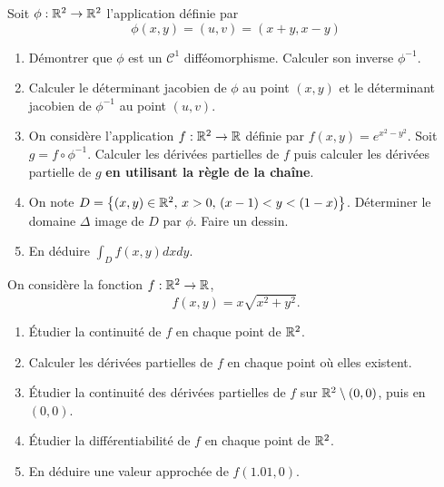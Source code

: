 \documentclass{tp_um}
\begin{document}
\exo{} Soit $\phi:\mathbb{R}^2\to\mathbb{R}^2$ l'application définie par 
\[
		\phi(x,y) = (u,v) = (x+y,x-y) 
\]
\begin{enumerate}
	\item Démontrer que $\phi$ est un $\mathcal C^1$ difféomorphisme. Calculer son inverse $\phi^{-1}$.
	\item Calculer le déterminant jacobien de $\phi$ au point $(x,y)$ et le déterminant jacobien de $\phi^{-1}$ au point $(u,v)$.
	\item On considère l'application $f: \mathbb{R}^2 \to \mathbb{R}$  définie par $f(x,y) = e^{x^2 -y^2}$. Soit
		$g = f \circ \phi^{-1}$. Calculer les dérivées partielles de $f$ puis calculer les dérivées partielle de $g$ {\bfseries en utilisant la règle de la chaîne}.
	\item On note $D =\left\{ (x,y) \in \mathbb{R}^2 ,\, x>0,\, (x-1) <y < (1-x) \right\}$. Déterminer le domaine $\Delta$ image de $D$ par $\phi$. Faire un dessin.
	\item En déduire $\int_D f(x,y) dxdy$.
\end{enumerate}

\exo{}On consid\`ere la fonction $ f: \mathbb{R}^2 \to \mathbb{R}$, 
$$
f(x,y) = x \sqrt{ x^2 + y^2}.
$$
\begin{enumerate}
	\item \'Etudier la continuité de $f$ en chaque point de $ \mathbb{R}^2$. 
	\item Calculer les dérivées partielles de $f$ en chaque point o\`u elles existent. 
	\item \'Etudier la continuit\'e des d\'eriv\'ees partielles de $f$ sur $ \mathbb{R} ^2 \setminus{(0,0)}$, puis en $(0,0)$.
	\item \'Etudier la  différentiabilité de $f$ en chaque point de $ \mathbb{R}^2$.
	\item %
		En déduire une valeur approchée de $f(1.01,0)$. %
\end{enumerate}
\end{document}
